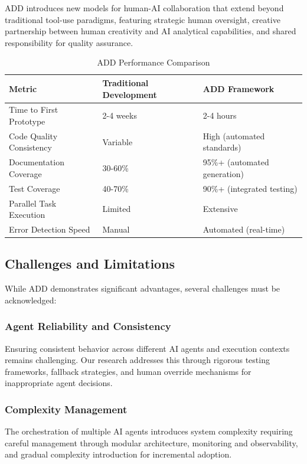 ADD introduces new models for human-AI collaboration that extend beyond traditional tool-use paradigms, featuring strategic human oversight, creative partnership between human creativity and AI analytical capabilities, and shared responsibility for quality assurance.

\begin{table}[ht]
\centering
\begin{tabular}{@{}lll@{}}
\toprule
\textbf{Metric} & \textbf{Traditional Development} & \textbf{ADD Framework} \\
\midrule
Time to First Prototype & 2-4 weeks & 2-4 hours \\
Code Quality Consistency & Variable & High (automated standards) \\
Documentation Coverage & 30-60\% & 95\%+ (automated generation) \\
Test Coverage & 40-70\% & 90\%+ (integrated testing) \\
Parallel Task Execution & Limited & Extensive \\
Error Detection Speed & Manual & Automated (real-time) \\
\bottomrule
\end{tabular}
\caption{ADD Performance Comparison}
\label{tab:add-performance}
\end{table}

\subsection{Challenges and Limitations}

While ADD demonstrates significant advantages, several challenges must be acknowledged:

\subsubsection{Agent Reliability and Consistency}

Ensuring consistent behavior across different AI agents and execution contexts remains challenging. Our research addresses this through rigorous testing frameworks, fallback strategies, and human override mechanisms for inappropriate agent decisions.

\subsubsection{Complexity Management}

The orchestration of multiple AI agents introduces system complexity requiring careful management through modular architecture, monitoring and observability, and gradual complexity introduction for incremental adoption.

